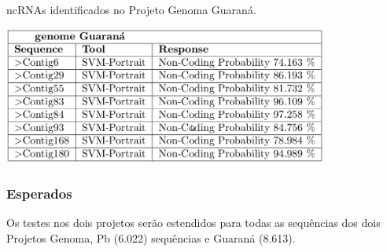 \begin{table}[htb!]
\caption{ncRNAs identificados no Projeto Genoma Guaraná.} \label{fig:ResulProjGuarana}
\centering
\includegraphics[angle=0,width=0.8\textwidth]{imagens//fig1.JPEG}
\end{table}

\subsubsection*{Esperados} \label{sec:Resulobter}

Os testes nos dois projetos serão estendidos para todas as sequências dos dois Projetos Genoma, Pb (6.022) sequências e Guaraná (8.613).
